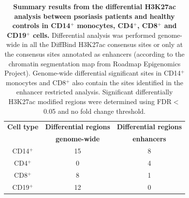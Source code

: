 \begin{table}[htbp]
\centering
\begin{tabular}{@{} c c c}
\toprule
\textbf{Cell type}   & \textbf{Differential regions}      & \textbf{Differential regions}      \\
                     & \textbf{genome-wide}              & \textbf{enhancers}     \\
\midrule
\midrule
CD14$^+$             & 15                 & 8                                \\
CD4$^+$              & 0                  & 4																	\\
CD8$^+$              & 8                  & 1                                 \\ 
CD19$^+$             & 12                 & 0                                 \\
\bottomrule 
\end{tabular}
\medskip %
\caption[Summary results from the differential H3K27ac analysis between psoriasis patients and healthy controls in CD14$^+$ monocytes, CD4$^+$, CD8$^+$ and CD19$^+$ cells.]{\textbf{Summary results from the differential H3K27ac analysis between psoriasis patients and healthy controls in CD14$^+$ monocytes, CD4$^+$, CD8$^+$ and CD19$^+$ cells.} Differential analysis was performed genome-wide in all the DiffBind H3K27ac consensus sites or only at the consensus sites annotated as enhancers (according to the chromatin segmentation map from Roadmap Epigenomics Project). Genome-wide differential significant sites in CD14$^+$ monocytes and CD8$^+$ also contain the sites identified in the enhancer restricted analysis. Significant differentially H3K27ac modified regions were determined using FDR$<$0.05 and no fold change threshold.}
\label{tab:ChIPm_differential_analysis_results}
\end{table}
\bigskip %


